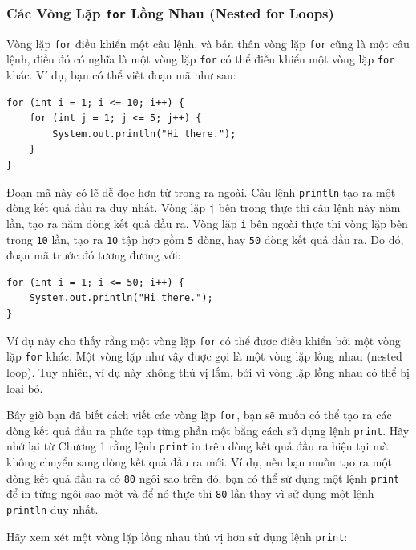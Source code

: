 \subsubsection{\texorpdfstring{Các Vòng Lặp \texttt{for} Lồng Nhau
(Nested for
Loops)}{Các Vòng Lặp for Lồng Nhau (Nested for Loops)}}\label{cuxe1c-vuxf2ng-lux1eb7p-for-lux1ed3ng-nhau-nested-for-loops}

Vòng lặp \texttt{for} điều khiển một câu lệnh, và bản thân vòng lặp
\texttt{for} cũng là một câu lệnh, điều đó có nghĩa là một vòng lặp
\texttt{for} có thể điều khiển một vòng lặp \texttt{for} khác. Ví dụ,
bạn có thể viết đoạn mã như sau:

\begin{verbatim}
for (int i = 1; i <= 10; i++) {
    for (int j = 1; j <= 5; j++) {
        System.out.println("Hi there.");
    }
}
\end{verbatim}

Đoạn mã này có lẽ dễ đọc hơn từ trong ra ngoài. Câu lệnh
\texttt{println} tạo ra một dòng kết quả đầu ra duy nhất. Vòng lặp
\texttt{j} bên trong thực thi câu lệnh này năm lần, tạo ra năm dòng kết
quả đầu ra. Vòng lặp \texttt{i} bên ngoài thực thi vòng lặp bên trong
\texttt{10} lần, tạo ra \texttt{10} tập hợp gồm \texttt{5} dòng, hay
\texttt{50} dòng kết quả đầu ra. Do đó, đoạn mã trước đó tương đương
với:

\begin{verbatim}
for (int i = 1; i <= 50; i++) {
    System.out.println("Hi there.");
}
\end{verbatim}

Ví dụ này cho thấy rằng một vòng lặp \texttt{for} có thể được điều khiển
bởi một vòng lặp \texttt{for} khác. Một vòng lặp như vậy được gọi là một
vòng lặp lồng nhau (nested loop). Tuy nhiên, ví dụ này không thú vị lắm,
bởi vì vòng lặp lồng nhau có thể bị loại bỏ.

Bây giờ bạn đã biết cách viết các vòng lặp \texttt{for}, bạn sẽ muốn có
thể tạo ra các dòng kết quả đầu ra phức tạp từng phần một bằng cách sử
dụng lệnh \texttt{print}. Hãy nhớ lại từ Chương 1 rằng lệnh
\texttt{print} in trên dòng kết quả đầu ra hiện tại mà không chuyển sang
dòng kết quả đầu ra mới. Ví dụ, nếu bạn muốn tạo ra một dòng kết quả đầu
ra có \texttt{80} ngôi sao trên đó, bạn có thể sử dụng một lệnh
\texttt{print} để in từng ngôi sao một và để nó thực thi \texttt{80} lần
thay vì sử dụng một lệnh \texttt{println} duy nhất.

Hãy xem xét một vòng lặp lồng nhau thú vị hơn sử dụng lệnh
\texttt{print}:

